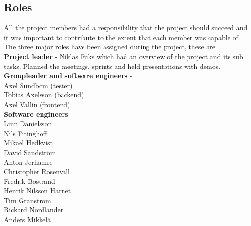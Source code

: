 \subsection{Roles} 
All the project members had a responsibility that the project should succeed and it was important to contribute to the extent that each member was capable of.\\
The three major roles have been assigned during the project, these are \\
\textbf{Project leader} - Niklas Fuks which had an overview of the project and its sub tasks. Planned the meetings, sprints and held presentations with demos. \\
\textbf{Groupleader and software engineers} -\\
Axel Sundbom (tester)\\
Tobias Axelsson (backend) \\
Axel Vallin (frontend) \\
\textbf{Software engineers} -\\
Linn Danielsson\\
Nils Fitinghoff\\
Mikael Hedkvist\\
David Sandström\\
Anton Jerhamre\\
Christopher Rosenvall\\
Fredrik Bostrand\\
Henrik Nilsson Harnet\\
Tim Granström\\
Rickard Nordlander\\
Anders Mikkelä\\
